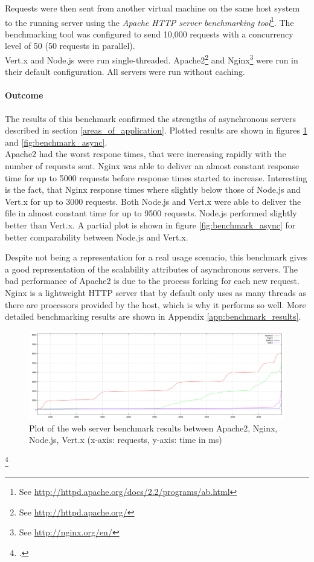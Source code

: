 Requests were then sent from another virtual machine on the same host system 
to the running server using the \textit{Apache HTTP server benchmarking 
tool}\footnote{See \url{http://httpd.apache.org/docs/2.2/programs/ab.html}}.
The benchmarking tool was configured to send 10,000 requests with a concurrency
level of 50 (50 requests in parallel).\\
Vert.x and Node.js were run single-threaded. Apache2\footnote{See \url{http://httpd.apache.org/}} and Nginx\footnote{See \url{http://nginx.org/en/}} were run in their
default configuration. All servers were run without caching.
\paragraph{Outcome} The results of this benchmark confirmed the strengths of asynchronous servers described in section \ref{areas_of_application}.
Plotted results are shown in figures \ref{fig:benchmark_all} and \ref{fig:benchmark_async}.\\
Apache2 had the worst respone times, that were increasing rapidly with the number of requests sent.
Nginx was able to deliver an almost constant response time for up to 5000 requests before response times started to increase.
Interesting is the fact, that Nginx response times where slightly below those of Node.js and Vert.x for up to 3000 requests.
Both Node.js and Vert.x were able to deliver the file in almost constant time for up to 9500 requests. Node.js performed slightly better than
Vert.x. A partial plot is shown in figure \ref{fig:benchmark_async} for better comparability between Node.js and Vert.x.

Despite not being a representation for a real usage scenario, this benchmark
gives a good representation of the scalability attributes of asynchronous 
servers. The bad performance of Apache2 is due to the process forking for each
new request. Nginx is a lightweight HTTP server that by default only uses as
many threads as there are processors provided by the host, which is why it
performs so well. More detailed benchmarking results are shown in Appendix \ref{app:benchmark_results}.


\begin{figure}[htbp]
\centering
\includegraphics[width=\textwidth]{img/200kb_benchmark.png}
\caption[Plot of the web server benchmark results (all servers)]{Plot of the web server benchmark results between Apache2, Nginx, Node.js, Vert.x (x-axis: requests, y-axis: time in ms)}
\label{fig:benchmark_all}
\end{figure}
\footcitetext{req_res}

